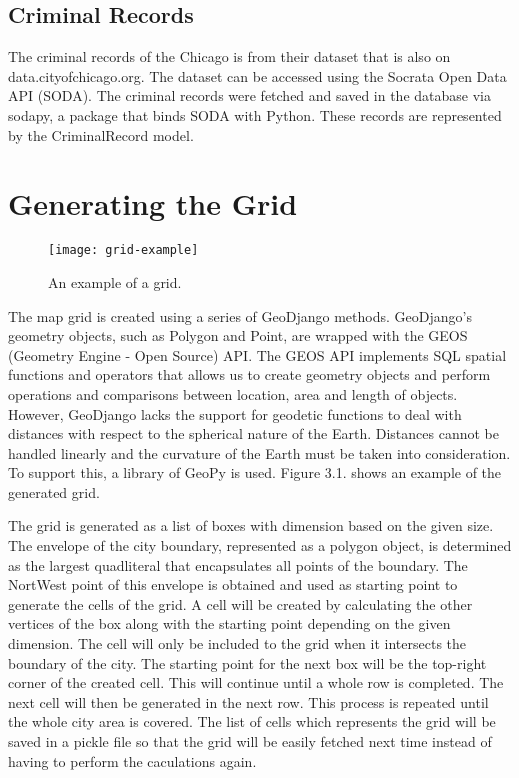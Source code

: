     \subsection{Criminal Records}
        The criminal records of the Chicago is from their dataset that is also on data.cityofchicago.org. The dataset can be accessed using the Socrata Open Data API (SODA). The criminal records were fetched and saved in the database via sodapy, a package that binds SODA with Python. These records are represented by the CriminalRecord model.

\section{Generating the Grid}
    \begin{figure}[h]
    \centering
    \texttt{[image: grid-example]}
    \caption{An example of a grid.}
    \end{figure}
    The map grid is created using a series of GeoDjango methods. GeoDjango's geometry objects, such as Polygon and Point, are wrapped with the GEOS (Geometry Engine - Open Source) API. The GEOS API implements SQL spatial functions and operators that allows us to create geometry objects and perform operations and comparisons between location, area and length of objects. However, GeoDjango lacks the support for geodetic functions to deal with distances with respect to the spherical nature of the Earth. Distances cannot be handled linearly and the curvature of the Earth must be taken into consideration. To support this, a library of GeoPy is used. Figure 3.1. shows an example of the generated grid.

    The grid is generated as a list of boxes with dimension based on the given size. The envelope of the city boundary, represented as a polygon object, is determined as the largest quadliteral that encapsulates all points of the boundary. The NortWest point of this envelope is obtained and used as starting point to generate the cells of the grid. A cell will be created by calculating the other vertices of the box along with the starting point depending on the given dimension. The cell will only be included to the grid when it intersects the boundary of the city. The starting point for the next box will be the top-right corner of the created cell. This will continue until a whole row is completed. The next cell will then be generated in the next row. This process is repeated until the whole city area is covered. The list of cells which represents the grid will be saved in a pickle file so that the grid will be easily fetched next time instead of having to perform the caculations again.

